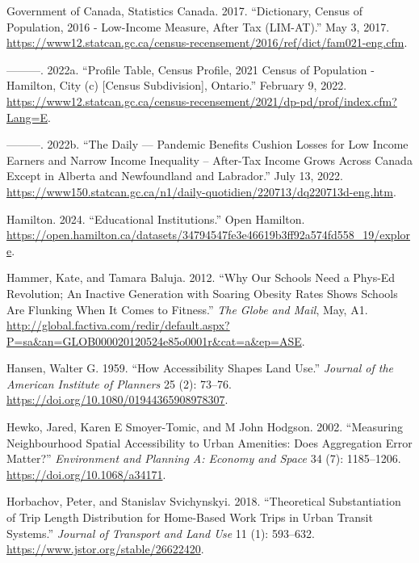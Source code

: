 \documentclass[
default
]{sn-jnl}
\newlength{\cslhangindent}
\newenvironment{CSLReferences}[2] %
 {\begin{list}{}{%
  \setlength{\itemindent}{0pt}
  \setlength{\leftmargin}{0pt}
  \setlength{\parsep}{0pt}
  \ifodd #1
   \setlength{\leftmargin}{\cslhangindent}
   \setlength{\itemindent}{-1\cslhangindent}
  \fi
  \setlength{\itemsep}{#2\baselineskip}}}
 {\end{list}}
\begin{document}
\begin{CSLReferences}{1}{0}
Government of Canada, Statistics Canada. 2017. {``Dictionary, Census of
Population, 2016 - Low-Income Measure, After Tax ({LIM}-{AT}).''} May 3,
2017.
\url{https://www12.statcan.gc.ca/census-recensement/2016/ref/dict/fam021-eng.cfm}.

---------. 2022a. {``Profile Table, Census Profile, 2021 Census of
Population - Hamilton, City (c) {[}Census Subdivision{]}, Ontario.''}
February 9, 2022.
\url{https://www12.statcan.gc.ca/census-recensement/2021/dp-pd/prof/index.cfm?Lang=E}.

---------. 2022b. {``The Daily --- Pandemic Benefits Cushion Losses for
Low Income Earners and Narrow Income Inequality -- After-Tax Income
Grows Across Canada Except in Alberta and Newfoundland and Labrador.''}
July 13, 2022.
\url{https://www150.statcan.gc.ca/n1/daily-quotidien/220713/dq220713d-eng.htm}.

Hamilton. 2024. {``Educational Institutions.''} Open Hamilton.
\url{https://open.hamilton.ca/datasets/34794547fe3e46619b3ff92a574fd558_19/explore}.

Hammer, Kate, and Tamara Baluja. 2012. {``Why Our Schools Need a Phys-Ed
Revolution; {An} Inactive Generation with Soaring Obesity Rates Shows
Schools Are Flunking When It Comes to Fitness.''} \emph{The Globe and
Mail}, May, A1.
\url{http://global.factiva.com/redir/default.aspx?P=sa&an=GLOB000020120524e85o0001r&cat=a&ep=ASE}.

Hansen, Walter G. 1959. {``How {Accessibility Shapes Land Use}.''}
\emph{Journal of the American Institute of Planners} 25 (2): 73--76.
\url{https://doi.org/10.1080/01944365908978307}.

Hewko, Jared, Karen E Smoyer-Tomic, and M John Hodgson. 2002.
{``Measuring Neighbourhood Spatial Accessibility to Urban Amenities:
Does Aggregation Error Matter?''} \emph{Environment and Planning A:
Economy and Space} 34 (7): 1185--1206.
\url{https://doi.org/10.1068/a34171}.

Horbachov, Peter, and Stanislav Svichynskyi. 2018. {``Theoretical
Substantiation of Trip Length Distribution for Home-Based Work Trips in
Urban Transit Systems.''} \emph{Journal of Transport and Land Use} 11
(1): 593--632. \url{https://www.jstor.org/stable/26622420}.


\end{CSLReferences}
\end{document}
